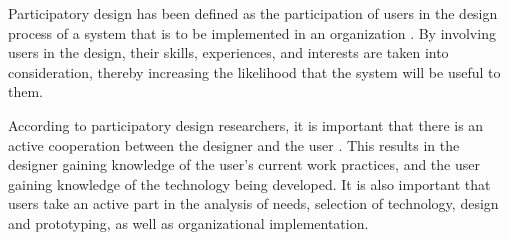 






Participatory design has been defined as the participation of users in the design process of a system that is to be implemented in an organization \cite{kensing_participatory_1998}. By involving users in the design, their skills, experiences, and interests are taken into consideration, thereby increasing the likelihood that the system will be useful to them.

According to participatory design researchers, it is important that there is an active cooperation between the designer and the user \cite{kensing_participatory_1998}. This results in the designer gaining knowledge of the user's current work practices, and the user gaining knowledge of the technology being developed. It is also important that users take an active part in the analysis of needs, selection of technology, design and prototyping, as well as organizational implementation.